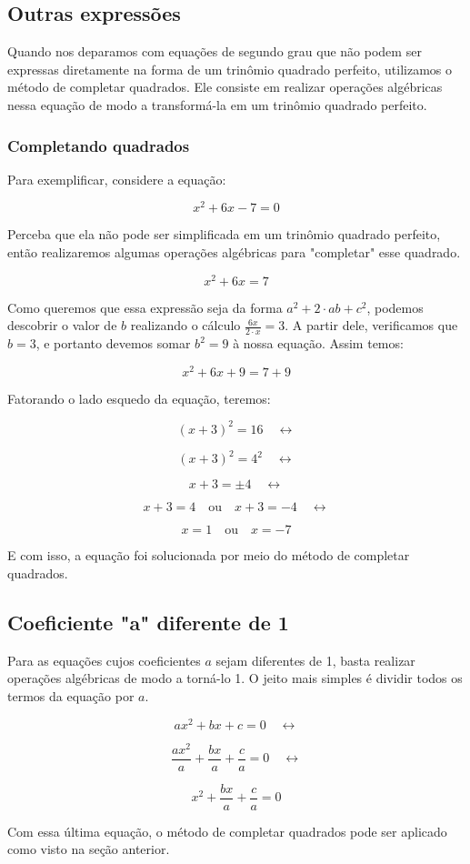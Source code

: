 \documentclass[../resumo.tex]{subfiles}
\begin{document}
	\subsection{Outras expressões}

	Quando nos deparamos com equações de segundo grau que não podem ser expressas diretamente
	na forma de um trinômio quadrado perfeito, utilizamos o método de completar quadrados.
	Ele consiste em realizar operações algébricas nessa equação de modo a transformá-la em um
	trinômio quadrado perfeito.
	
	\subsubsection{Completando quadrados}
	
	Para exemplificar, considere a equação:

	\[x^2 + 6x - 7 = 0\]

	Perceba que ela não pode ser simplificada em um trinômio quadrado perfeito, então realizaremos
	algumas operações algébricas para "completar" esse quadrado.

	\[x^2 + 6x = 7\]

	Como queremos que essa expressão seja da forma \(a^2 + 2\cdot ab + c^2\), podemos descobrir o 
	valor de $b$ realizando o cálculo \(\frac{6x}{2\cdot x} = 3\). A partir dele, verificamos que $b = 3$,
	e portanto devemos somar $b^2 = 9$ à nossa equação. Assim temos:

	\[x^2 + 6x + 9 = 7 + 9\]

	Fatorando o lado esquedo da equação, teremos:

	\[(x + 3)^2 = 16 \quad \leftrightarrow\]

	\[(x + 3)^2 = 4^2 \quad \leftrightarrow\]

	\[x + 3 = \pm 4 \quad \leftrightarrow\]

	\[x + 3 = 4 \quad \textrm{ou} \quad x + 3 = -4 \quad \leftrightarrow\]

	\[x = 1 \quad \textrm{ou} \quad x = -7\]

	E com isso, a equação foi solucionada por meio do método de
	completar quadrados.


	\subsection{Coeficiente "a" diferente de 1}

	Para as equações cujos coeficientes $a$ sejam diferentes de 1, basta
	realizar operações algébricas de modo a torná-lo 1. O jeito mais simples
	é dividir todos os termos da equação por $a$.

	\[ax^2 + bx + c = 0 \quad \leftrightarrow \]

	\[\frac{ax^2}{a} + \frac{bx}{a} + \frac{c}{a} = 0 \quad \leftrightarrow \]

	\[x^2 + \frac{bx}{a} + \frac{c}{a} = 0\]

	Com essa última equação, o método de completar quadrados pode ser aplicado como visto
	na seção anterior.
\end{document}
